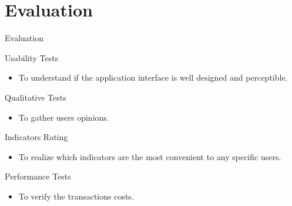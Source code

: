 
\section{Evaluation}

\begin{frame}{Evaluation}
	\begin{block}{Usability Tests}
		\begin{itemize}
			\item To understand if the application interface is well designed and perceptible. \\
		\end{itemize}
	\end{block}
	\begin{block}{Qualitative Tests}
			\begin{itemize}
				\item To gather users opinions. \\
			\end{itemize}
	\end{block}
	\begin{block}{Indicators Rating}
			\begin{itemize}
				\item To realize which indicators are the most convenient to any specific users. \\
			\end{itemize}
	\end{block}
	\begin{block}{Performance Tests}
			\begin{itemize}
				\item To verify the transactions costs. \\
			\end{itemize}
	\end{block}

\end{frame}
